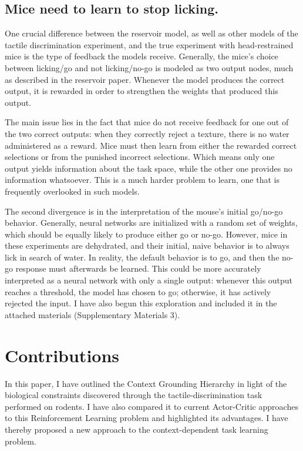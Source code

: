 \documentclass[11pt]{article}
\begin{document}
\subsection{Mice need to learn to stop licking.}
One crucial difference between the reservoir model, as well as other models of the tactile discrimination experiment, and the true experiment with head-restrained mice is the type of feedback the models receive.  Generally, the mice's choice between licking/go and not licking/no-go is modeled as two output nodes, much as described in the reservoir paper.  Whenever the model produces the correct output, it is rewarded in order to strengthen the weights that produced this output.  

The main issue lies in the fact that mice do not receive feedback for one out of the two correct outputs: when they correctly reject a texture, there is no water administered as a reward.  Mice must then learn from either the rewarded correct selections or from the punished incorrect selections.  Which means only one output yields information about the task space, while the other one provides no information whatsoever.  This is a much harder problem to learn, one that is frequently overlooked in such models.

The second divergence is in the interpretation of the mouse's initial go/no-go behavior.  Generally, neural networks are initialized with a random set of weights, which should be equally likely to produce either go or no-go.  However, mice in these experiments are dehydrated, and their initial, naive behavior is to always lick in search of water.  In reality, the default behavior is to go, and then the no-go response must afterwards be learned.  This could be more accurately interpreted as a neural network with only a single output: whenever this output reaches a threshold, the model has chosen to go; otherwise, it has actively rejected the input.  I have also begun this exploration and included it in the attached materials (Supplementary Materials 3).

\section{Contributions}
In this paper, I have outlined the Context Grounding Hierarchy in light of the biological constraints discovered through the tactile-discrimination task performed on rodents.  I have also compared it to current Actor-Critic approaches to this Reinforcement Learning problem and highlighted its advantages.  I have thereby proposed a new approach to the context-dependent task learning problem.
\end{document}
